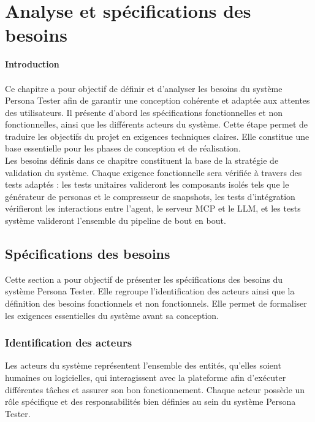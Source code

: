\chapter{Analyse et spécifications des besoins}

{\LARGE \bfseries Introduction\\[0.4cm] }
\\ Ce chapitre a pour objectif de définir et d’analyser les besoins du système Persona Tester afin de garantir une conception cohérente et adaptée aux attentes des utilisateurs. Il présente d’abord les spécifications fonctionnelles et non fonctionnelles, ainsi que les différents acteurs du système. Cette étape permet de traduire les objectifs du projet en exigences techniques claires. Elle constitue une base essentielle pour les phases de conception et de réalisation.\\

Les besoins définis dans ce chapitre constituent la base de la stratégie de validation du système. Chaque exigence fonctionnelle sera vérifiée à travers des tests adaptés : les tests unitaires valideront les composants isolés tels que le générateur de personas et le compresseur de snapshots, les tests d'intégration vérifieront les interactions entre l'agent, le serveur MCP et le LLM, et les tests système valideront l'ensemble du pipeline de bout en bout.



\section{Spécifications des besoins}
Cette section a pour objectif de présenter les spécifications des besoins du système Persona Tester. Elle regroupe l’identification des acteurs ainsi que la définition des besoins fonctionnels et non fonctionnels. Elle permet de formaliser les exigences essentielles du système avant sa conception.

\subsection{Identification des acteurs }  
Les acteurs du système représentent l’ensemble des entités, qu’elles soient humaines ou logicielles, qui interagissent avec la plateforme afin d’exécuter différentes tâches et assurer son bon fonctionnement. Chaque acteur possède un rôle spécifique et des responsabilités bien définies au sein du système Persona Tester.\\



